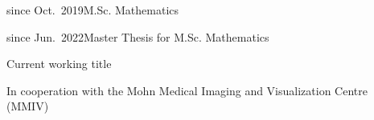 \documentclass[a4paper,10pt]{cv}
\begin{document}
      \begin{cvTimeItem}{since Oct.~2019}{M.Sc. Mathematics}
      \end{cvTimeItem}

      \begin{cvTimeItem}{since Jun.~2022}{Master Thesis for M.Sc. Mathematics}
        \begin{cvItemize}
          \item Current working title 
          \item In cooperation with the Mohn Medical Imaging and Visualization Centre (MMIV)
        \end{cvItemize}
      \end{cvTimeItem}
\end{document}
